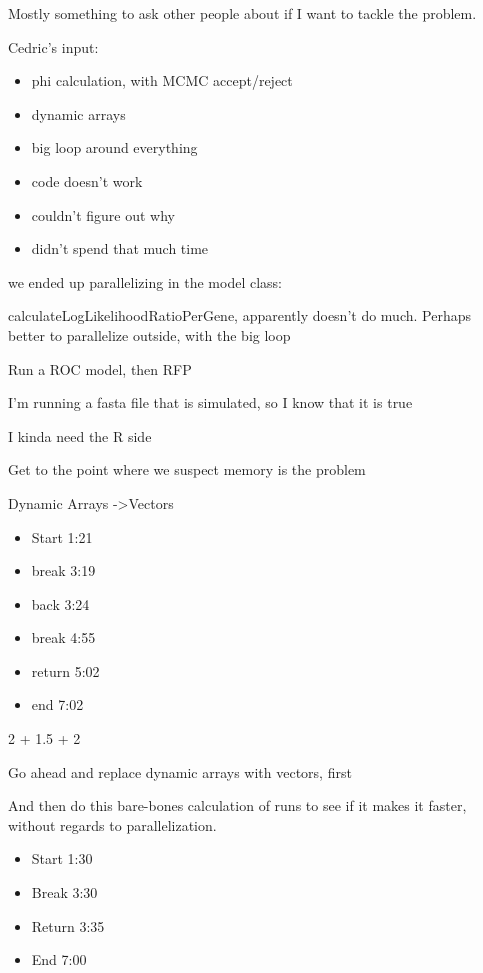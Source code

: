\documentclass[12pt,hyperref]{labbook}
\begin{document}
Mostly something to ask other people about if I want to tackle the problem.



Cedric's input:
\begin{itemize}
    \item phi calculation, with MCMC accept/reject
    \item dynamic arrays
    \item big loop around everything
    \item code doesn’t work
    \item couldn’t figure out why
    \item didn’t spend that much time
\end{itemize}

we ended up parallelizing in the model class:

calculateLogLikelihoodRatioPerGene, apparently doesn’t do much.
Perhaps better to parallelize outside, with the big loop

Run a ROC model, then RFP

I’m running a fasta file that is simulated, so I know that it is true

I kinda need the R side

Get to the point where we suspect memory is the problem

Dynamic Arrays -\textgreater Vectors


\begin{itemize}
    \item Start 1:21
    \item break 3:19
    \item back 3:24
    \item break 4:55
    \item return 5:02
    \item end 7:02
\end{itemize}

2 + 1.5 + 2


Go ahead and replace dynamic arrays with vectors, first

And then do this bare-bones calculation of runs to see if it makes it faster,
without regards to parallelization.


\begin{itemize}
    \item Start 1:30
    \item Break 3:30
    \item Return 3:35
    \item End 7:00
\end{itemize}
\end{document}
